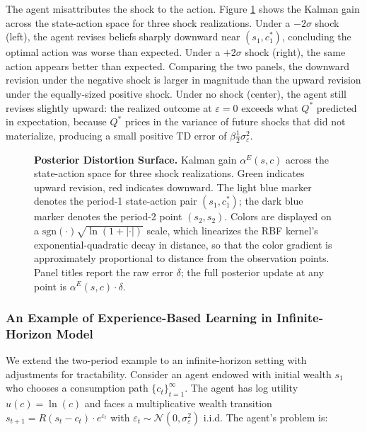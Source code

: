 The agent misattributes the shock to the action. Figure \ref{fig:update_surface} shows the Kalman
gain across the state-action space for three shock realizations. Under a $-2\sigma$ shock (left), the
agent revises beliefs sharply downward near $(s_1, c_1^*)$, concluding the optimal action was
worse than expected. Under a $+2\sigma$ shock (right), the same action appears better than
expected. Comparing the two panels, the downward revision under the negative shock is larger in
magnitude than the upward revision under the equally-sized positive shock. Under no shock (center), the agent
still revises slightly upward: the realized outcome at $\varepsilon = 0$ exceeds what $Q^*$
predicted in expectation, because $Q^*$ prices in the variance of future shocks that did not
materialize, producing a small positive TD error of $\beta \tfrac{1}{2}\sigma_\varepsilon^2$.

\begin{figure} \label{fig:update_surface}
\centering
\resizebox{\textwidth}{!}{}
\caption[Posterior Distortion Surface]{
  \textbf{Posterior Distortion Surface.} Kalman gain $\alpha^E(s,c)$ across the state-action space for three shock realizations.
  Green indicates upward revision, red indicates downward. The light blue marker denotes the
  period-1 state-action pair $(s_1, c_1^*)$; the dark blue marker denotes the period-2
  point $(s_2, s_2)$. Colors are displayed on a $\mathrm{sgn}(\cdot)\sqrt{\ln(1+|\cdot|)}$ scale,
  which linearizes the RBF kernel's exponential-quadratic decay in distance, so that the color
  gradient is approximately proportional to distance from the observation points. Panel
  titles report the raw error $\delta$; the full posterior update at any point is
  $\alpha^E(s,c) \cdot \delta$.}
\end{figure}

\subsubsection{An Example of Experience-Based Learning in Infinite-Horizon Model}

We extend the two-period example to an infinite-horizon setting with adjustments for
tractability. Consider an agent endowed with initial wealth $s_1$ who chooses a consumption
path $\{c_t\}_{t=1}^\infty$. The agent has log utility $u(c) = \ln(c)$ and faces a multiplicative
wealth transition $s_{t+1} = R(s_t - c_t) \cdot e^{\varepsilon_t}$ with $\varepsilon_t \sim
\mathcal{N}(0, \sigma_\varepsilon^2)$ i.i.d. The agent's problem is:

